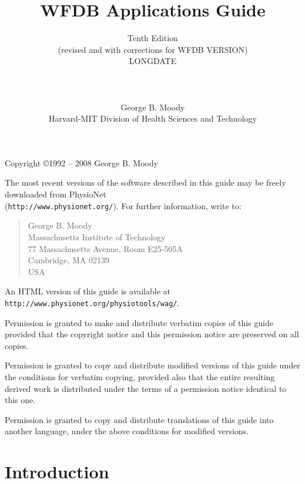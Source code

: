 \documentclass[twoside]{book}
\title{WFDB Applications Guide}
\author{Tenth Edition\\
(revised and with corrections for WFDB VERSION)\\
LONGDATE\\
\\
\\
\\
George B. Moody\\
Harvard-MIT Division of Health Sciences and Technology}
\date{}
\begin{document}
\maketitle

\pagestyle{empty}
\vspace*{\fill}
\noindent
Copyright \copyright 1992 -- 2008 George B. Moody

\vspace{1 in}
\noindent
The most recent versions of the software described in this guide may be
freely downloaded from PhysioNet\\
({\tt http://www.physionet.org/}).
For further information, write to:

\begin{quote}
George B. Moody\\
Massachusetts Institute of Technology\\
77 Massachusetts Avenue, Room E25-505A\\
Cambridge, MA 02139\\
USA\\
\end{quote}

\noindent
An HTML version of this guide is available at
{\tt http://www.\-physio\-net.\-org/\-physio\-tools/\-wag/}.

\vspace{0.2 in}
\noindent
Permission is granted to make and distribute verbatim copies of this
guide provided that the copyright notice and this permission notice are
preserved on all copies.

\vspace{0.2 in}
\noindent
Permission is granted to copy and distribute modified versions of this
guide under the conditions for verbatim copying, provided also that the
entire resulting derived work is distributed under the terms of a
permission notice identical to this one.

\vspace{0.2 in}
\noindent
Permission is granted to copy and distribute translations of this guide
into another language, under the above conditions for modified versions.

\newpage
\pagestyle{fancyplain}

\tableofcontents

\newpage
{}


\chapter*{Introduction}
\end{document}
